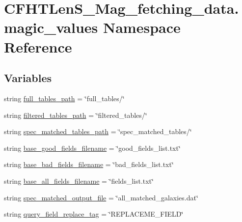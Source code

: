 \hypertarget{namespaceCFHTLenS__Mag__fetching__data_1_1magic__values}{\section{C\-F\-H\-T\-Len\-S\-\_\-\-Mag\-\_\-fetching\-\_\-data.\-magic\-\_\-values Namespace Reference}
\label{namespaceCFHTLenS__Mag__fetching__data_1_1magic__values}
}
\subsection*{Variables}
\begin{DoxyCompactItemize}
\item 
string \hyperlink{namespaceCFHTLenS__Mag__fetching__data_1_1magic__values_a6623af4a04d0c179f222fed2ebefd1c4}{full\-\_\-tables\-\_\-path} = \char`\"{}full\-\_\-tables/\char`\"{}
\item 
string \hyperlink{namespaceCFHTLenS__Mag__fetching__data_1_1magic__values_aad072510df8746840ffa27dec1412edf}{filtered\-\_\-tables\-\_\-path} = \char`\"{}filtered\-\_\-tables/\char`\"{}
\item 
string \hyperlink{namespaceCFHTLenS__Mag__fetching__data_1_1magic__values_a569e8242a22473719634cb6689432e43}{spec\-\_\-matched\-\_\-tables\-\_\-path} = \char`\"{}spec\-\_\-matched\-\_\-tables/\char`\"{}
\item 
string \hyperlink{namespaceCFHTLenS__Mag__fetching__data_1_1magic__values_ae3fe6964df3fa290e69d437cf8822643}{base\-\_\-good\-\_\-fields\-\_\-filename} = \char`\"{}good\-\_\-fields\-\_\-list.\-txt\char`\"{}
\item 
string \hyperlink{namespaceCFHTLenS__Mag__fetching__data_1_1magic__values_a7b2ee7b5c782ab9a557d8dfc76a54d54}{base\-\_\-bad\-\_\-fields\-\_\-filename} = \char`\"{}bad\-\_\-fields\-\_\-list.\-txt\char`\"{}
\item 
string \hyperlink{namespaceCFHTLenS__Mag__fetching__data_1_1magic__values_a6f1af329b28ab8462022dfb43da9f383}{base\-\_\-all\-\_\-fields\-\_\-filename} = \char`\"{}fields\-\_\-list.\-txt\char`\"{}
\item 
string \hyperlink{namespaceCFHTLenS__Mag__fetching__data_1_1magic__values_a3a435017ca0c52b0b2c9321234e3098b}{spec\-\_\-matched\-\_\-output\-\_\-file} = \char`\"{}all\-\_\-matched\-\_\-galaxies.\-dat\char`\"{}
\item 
string \hyperlink{namespaceCFHTLenS__Mag__fetching__data_1_1magic__values_a056a77ba60ed7310cca0c428e6fa7aca}{query\-\_\-field\-\_\-replace\-\_\-tag} = \char`\"{}R\-E\-P\-L\-A\-C\-E\-M\-E\-\_\-\-F\-I\-E\-L\-D\char`\"{}

\end{DoxyCompactItemize}
